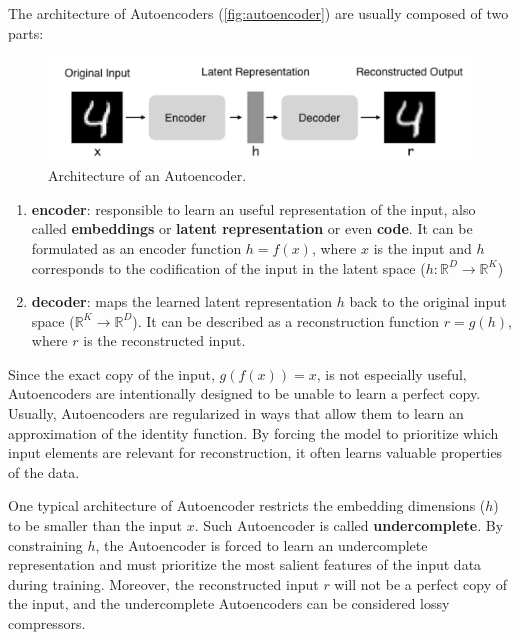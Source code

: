 The architecture of Autoencoders (\autoref{fig:autoencoder}) are usually composed of two parts:

\begin{figure}[h]
\centering
\includegraphics[width=\linewidth]{images/autoencoder.png}
\caption{Architecture of an Autoencoder.}
\label{fig:autoencoder}
\end{figure}

\begin{enumerate}
\item \textbf{encoder}: responsible to learn an useful representation of the input, also called \textbf{embeddings} or \textbf{latent representation} or even \textbf{code}. It can be formulated as an encoder function $h = f(x)$, where $x$ is the input and $h$ corresponds to the codification of the input in the latent space ($h: \mathbb{R}^D \rightarrow \mathbb{R}^K$)

\item \textbf{decoder}: maps the learned latent representation $h$ back to the original input space ($\mathbb{R}^K \rightarrow \mathbb{R}^D$). It can be described as a reconstruction function $r = g(h)$, where $r$ is the reconstructed input.
\end{enumerate}

Since the exact copy of the input, $g(f(x)) = x$, is not especially useful, Autoencoders are intentionally designed to be unable to learn a perfect copy. Usually, Autoencoders are regularized in ways that allow them to learn an approximation of the identity function. By forcing the model to prioritize which input elements are relevant for reconstruction,  it often learns valuable properties of the data.

One typical architecture of Autoencoder restricts the embedding dimensions ($h$) to be smaller than the input $x$. Such Autoencoder is called \textbf{undercomplete}. By constraining $h$, the Autoencoder is forced to learn an undercomplete representation and must prioritize the most salient features of the input data during training. Moreover, the reconstructed input $r$ will not be a perfect copy of the input, and the undercomplete Autoencoders can be considered lossy compressors.

